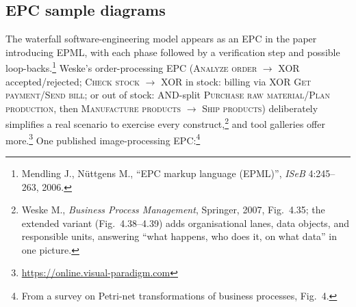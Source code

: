 \subsection{EPC sample diagrams}

The waterfall software-engineering model appears as an EPC in the paper introducing EPML, with each phase followed by a verification step and possible loop-backs.\footnote{Mendling J., N\"uttgens M., ``EPC markup language (EPML)'', \emph{ISeB} 4:245--263, 2006.} Weske's order-processing EPC (\textsc{Analyze order} $\to$ XOR accepted/rejected; \textsc{Check stock} $\to$ XOR in stock: billing via XOR \textsc{Get payment}/\textsc{Send bill}; or out of stock: AND-split \textsc{Purchase raw material}/\textsc{Plan production}, then \textsc{Manufacture products} $\to$ \textsc{Ship products}) deliberately simplifies a real scenario to exercise every construct,\footnote{Weske M., \emph{Business Process Management}, Springer, 2007, Fig.~4.35; the extended variant (Fig.~4.38--4.39) adds organisational lanes, data objects, and responsible units, answering ``what happens, who does it, on what data'' in one picture.} and tool galleries offer more.\footnote{\url{https://online.visual-paradigm.com}} One published image-processing EPC:\footnote{From a survey on Petri-net transformations of business processes, Fig.~4.}
